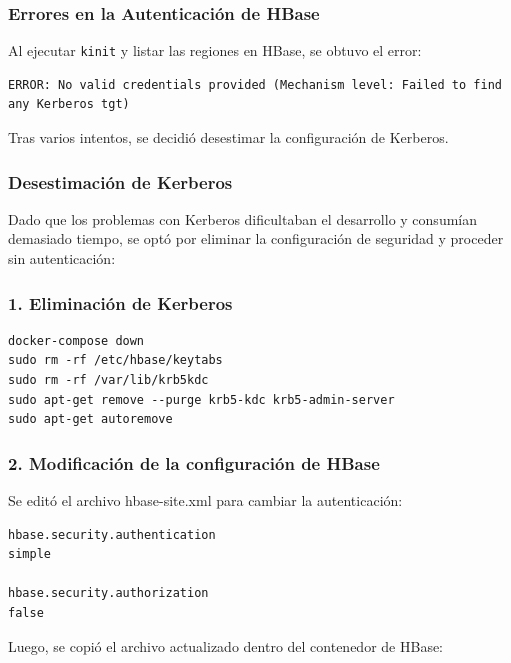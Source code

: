 \documentclass{article}
\begin{document}
\vspace{5mm}


\subsubsection{Errores en la Autenticación de HBase}

Al ejecutar \texttt{kinit} y listar las regiones en HBase, se obtuvo el error:

\begin{verbatim}
ERROR: No valid credentials provided (Mechanism level: Failed to find any Kerberos tgt)
\end{verbatim}

Tras varios intentos, se decidió desestimar la configuración de Kerberos.

\subsubsection{Desestimación de Kerberos}
Dado que los problemas con Kerberos dificultaban el desarrollo y consumían demasiado tiempo, se optó por eliminar la configuración de seguridad y proceder sin autenticación:

\vspace{5mm}

\subsubsection{1. Eliminación de Kerberos}

\begin{lstlisting}[style=bashStyle]
docker-compose down
sudo rm -rf /etc/hbase/keytabs
sudo rm -rf /var/lib/krb5kdc
sudo apt-get remove --purge krb5-kdc krb5-admin-server
sudo apt-get autoremove
\end{lstlisting}

\newpage
\subsubsection{2. Modificación de la configuración de HBase}

Se editó el archivo hbase-site.xml para cambiar la autenticación:


\begin{verbatim}
hbase.security.authentication
simple

hbase.security.authorization
false
\end{verbatim}

Luego, se copió el archivo actualizado dentro del contenedor de HBase:
\end{document}
